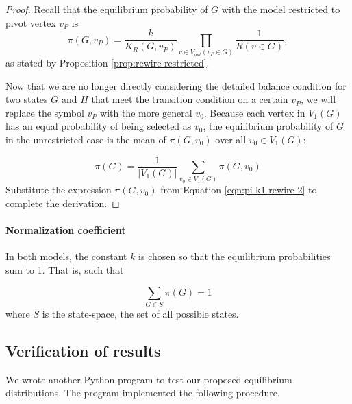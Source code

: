 \documentclass[a4paper,10pt]{article}
\begin{document}
\begin{proof}
Recall that the equilibrium probability of $G$ with the model restricted to pivot vertex $v_P$ is
 \begin{equation}
 \label{eqn:pi-k1-rewire-2}
  \pi(G, v_P) = \frac{k}{K_R(G, v_P)} 
 \prod \limits_{v \in V_{out}(v_P \in G)} \frac{1}{R(v \in G)},
 \end{equation}
as stated by Proposition \ref{prop:rewire-restricted}.

Now that we are no longer directly considering the detailed balance condition for two states $G$ and $H$ that meet the transition condition on a certain $v_P$, we will replace the symbol $v_P$ with the more general $v_0$. Because each vertex in $V_1(G)$ has an equal probability of being selected as $v_0$, the equilibrium probability of $G$ in the unrestricted case is the mean of $\pi(G, v_0)$ over all $v_0 \in V_1(G)$:

\begin{equation}
   \pi(G) = \frac{1}{|V_1(G)|} \sum\limits_{v_0 \in V_1(G)} 
 \pi(G, v_0)
\end{equation}
Substitute the expression $\pi(G, v_0)$ from Equation \ref{eqn:pi-k1-rewire-2} to complete the derivation.

\end{proof}

\paragraph{Normalization coefficient}
In both models, the constant $k$ is chosen so that the equilibrium probabilities sum to 1. That is, such that

\begin{equation}
 \sum\limits_{G \in S} \pi(G) = 1
\end{equation}
where $S$ is the state-space, the set of all possible states.

\subsection{Verification of results}

We wrote another Python program to test our proposed equilibrium distributions. The program implemented the following procedure.
\end{document}
